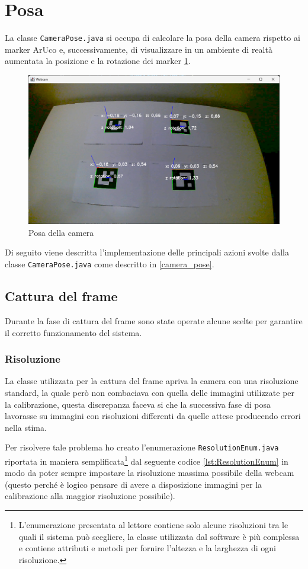 \documentclass[12pt,a4paper,openright,twoside]{book}
\begin{document}
\section{Posa}
La classe \texttt{CameraPose.java} si occupa di calcolare la posa della camera rispetto ai marker ArUco e, successivamente, di visualizzare in un ambiente di realtà aumentata la posizione e la rotazione dei marker \ref{fig:camera_pose_example}.
\begin{figure}
	\centering
	\includegraphics[width=0.9\linewidth]{./figures/test/figure2.png}
	\caption{Posa della camera}
	\label{fig:camera_pose_example}
\end{figure}

Di seguito viene descritta l'implementazione delle principali azioni svolte dalla classe \texttt{CameraPose.java} come descritto in \ref{camera_pose}.
\subsection{Cattura del frame} \label{subsec:cattura_del_frame}
Durante la fase di cattura del frame sono state operate alcune scelte per garantire il corretto funzionamento del sistema.
\subsubsection{Risoluzione}
La classe utilizzata per la cattura del frame apriva la camera con una risoluzione standard, la quale però non combaciava con quella delle immagini utilizzate per la calibrazione, questa discrepanza faceva si che la successiva fase di posa lavorasse su immagini con risoluzioni differenti da quelle attese producendo errori nella stima.

Per risolvere tale problema ho creato l'enumerazione \texttt{ResolutionEnum.java} riportata in maniera semplificata\footnote{L'enumerazione presentata al lettore contiene solo alcune risoluzioni tra le quali il sistema può scegliere, la classe utilizzata dal software è più complessa e contiene attributi e metodi per fornire l'altezza e la larghezza di ogni risoluzione.} dal seguente codice \cref{lst:ResolutionEnum} in modo da poter sempre impostare la risoluzione massima possibile della webcam (questo perché è logico pensare di avere a disposizione immagini per la calibrazione alla maggior risoluzione possibile).

\end{document}
